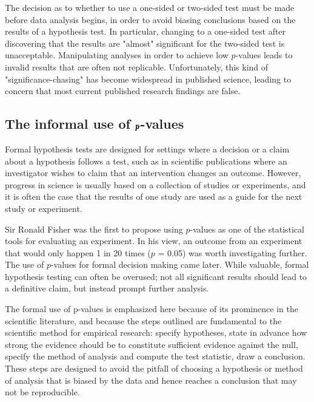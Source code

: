 The decision as to whether to use a one-sided or two-sided test must be made before data analysis begins, in order to avoid biasing conclusions based on the results of a hypothesis test. In particular, changing to a one-sided test after discovering that the results are "almost" significant for the two-sided test is unacceptable. Manipulating analyses in order to achieve low $p$-values leads to invalid results that are often not replicable. Unfortunately, this kind of "significance-chasing" has become widespread in published science, leading to concern that most current published research findings are false.






\subsection{The informal use of $\pmb{\MakeLowercase{p}}$-values}
\label{informalUseOfp-values}

Formal hypothesis tests are designed for settings where a decision or a claim about a hypothesis follows a test, such as in scientific publications where an investigator wishes to claim that an intervention changes an outcome.  However, progress in science is usually based on a collection of studies or experiments, and it is often the case that the results of one study are used as a guide for the next study or experiment. 

Sir Ronald Fisher was the first to propose using $p$-values as one of the statistical tools for evaluating an experiment.  In his view, an outcome from an experiment that would only happen 1 in 20 times ($p$ = 0.05) was worth investigating further. The use of $p$-values for formal decision making came later.  While valuable, formal hypothesis testing can often be overused; not all significant results should lead to a definitive claim, but instead prompt further analysis.

The formal use of p-values is emphasized here because of its prominence in the scientific literature, and because the steps outlined are fundamental to the scientific method for empirical research: specify hypotheses, state in advance how strong the evidence should be to constitute sufficient evidence against the null, specify the method of analysis and compute the test statistic, draw a conclusion. These steps are designed to avoid the pitfall of choosing a hypothesis or method of analysis that is biased by the data and hence reaches a conclusion that may not be reproducible.



